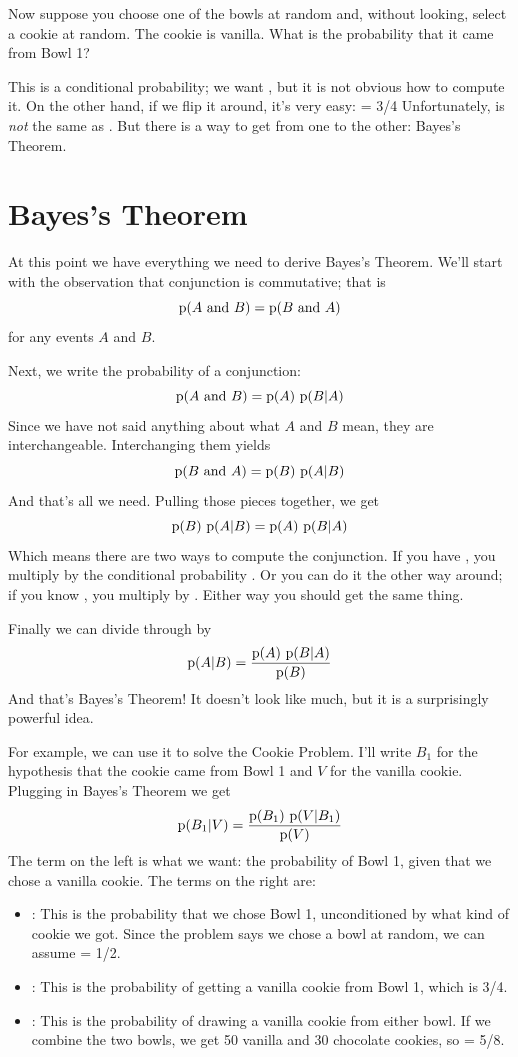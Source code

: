 \documentclass[12pt]{book}
\begin{document}
Now suppose you choose one of the bowls at random and, without looking,
select a cookie at random.  The cookie is vanilla.  What is the probability
that it came from Bowl 1?

This is a conditional probability; we want ,
but it is not obvious how to compute it.  On the other
hand, if we flip it around, it's very easy:
%
 = 3/4
%
Unfortunately,  is {\em not} the same as .  But there
is a way to get from one to the other: Bayes's Theorem.


\section{Bayes's Theorem}

At this point we have everything we need to derive Bayes's Theorem.
We'll start with the observation that conjunction is commutative; that is
%
\[ \mathrm{p}(A ~\mathrm{and}~ B) = \mathrm{p}(B ~\mathrm{and}~ A) \]
%
for any events $A$ and $B$.

Next, we write the probability of a conjunction:
%
\[ \mathrm{p}(A ~\mathrm{and}~ B) = \mathrm{p}(A)~\mathrm{p}(B|A) \]
%
Since we have not said anything about what $A$ and $B$ mean, they
are interchangeable.  Interchanging them yields
%
\[ \mathrm{p}(B ~\mathrm{and}~ A) = \mathrm{p}(B)~\mathrm{p}(A|B) \]
%
And that's all we need.  Pulling those pieces together, we get
%
\[ \mathrm{p}(B)~\mathrm{p}(A|B) = \mathrm{p}(A)~\mathrm{p}(B|A) \]
%
Which means there are two ways to compute the conjunction.
If you have , you multiply by the conditional
probability .  Or you can do it the other way around; if you
know , you multiply by .  Either way you should get
the same thing.

Finally we can divide through by 
%
\[ \mathrm{p}(A|B) = \frac{\mathrm{p}(A)~\mathrm{p}(B|A)}{\mathrm{p}(B)} \]
%
And that's Bayes's Theorem!  It doesn't look like much, but
it is a surprisingly powerful idea.

For example, we can use it to solve the Cookie Problem.  I'll write
$B_1$ for the hypothesis that the cookie came from Bowl 1
and $V$ for the vanilla cookie.  Plugging in Bayes's Theorem
we get
%
\[ \mathrm{p}(B_1|V) = \frac{\mathrm{p}(B_1)~\mathrm{p}(V|B_1)}{\mathrm{p}(V)} \]
%
The term on the left is what we want: the probability of Bowl 1, given
that we chose a vanilla cookie.  The terms on the right are:

\begin{itemize}

\item {}: This is the probability that we chose Bowl 1, unconditioned
by what kind of cookie we got.  Since the problem says we chose a
bowl at random, we can assume  = 1/2.

\item {}: This is the probability of getting a vanilla cookie
from Bowl 1, which is 3/4.

\item {}: This is the probability of drawing a vanilla cookie from
either bowl.  If we combine the two bowls, we get 50 vanilla and 30
chocolate cookies, so  = 5/8.

\end{itemize}
\end{document}
